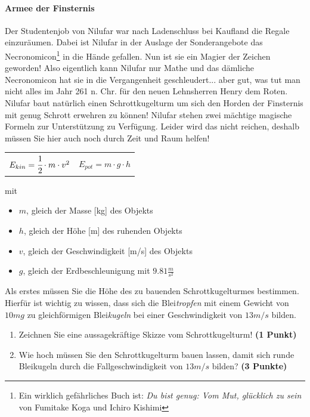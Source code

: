 \documentclass[a4paper, 9pt]{scrartcl}\usepackage[]{graphicx}\usepackage[]{xcolor}
\begin{document}
\ifcollection
\paragraph{Armee der Finsternis}
\fi



Der Studentenjob von Nilufar war nach Ladenschluss bei Kaufland die Regale einzuräumen. Dabei ist Nilufar in der Auslage der Sonderangebote das Necronomicon\footnote{Ein wirklich gefährliches Buch ist: \textit{Du bist genug: Vom Mut, glücklich zu sein} von Fumitake Koga und Ichiro Kishimi} in die Hände gefallen. Nun ist sie ein Magier der Zeichen geworden! Also eigentlich kann Nilufar nur Mathe und das dämliche Necronomicon hat sie in die Vergangenheit geschleudert... aber gut, was tut man nicht alles im Jahr 261 n. Chr. für den neuen Lehnsherren Henry dem Roten. Nilufar baut natürlich einen Schrottkugelturm um sich den
Horden der Finsternis mit genug Schrott erwehren zu können! Nilufar stehen zwei mächtige magische Formeln zur Unterstützung zu Verfügung. Leider wird das nicht reichen, deshalb müssen Sie hier auch noch durch Zeit und Raum helfen!

\begin{center}
  \begin{tabular}{cc}
    $E_{kin} = \cfrac{1}{2}\cdot m \cdot v^2$ & $E_{pot} = m \cdot g \cdot h$\\
  \end{tabular}
\end{center}

mit

\begin{itemize}[noitemsep]
\item $m$, gleich der Masse [kg] des Objekts
\item $h$, gleich der Höhe [m] des ruhenden Objekts
\item $v$, gleich der Geschwindigkeit [m/s] des Objekts
\item $g$, gleich der Erdbeschleunigung mit $9.81 \tfrac{m}{s^2}$ 
\end{itemize}

Als erstes müssen Sie die Höhe des zu bauenden Schrottkugelturmes bestimmen. Hierfür ist wichtig zu wissen, dass sich die Blei\textit{tropfen} mit einem Gewicht von $10mg$ zu gleichförmigen Blei\textit{kugeln} bei einer Geschwindigkeit von $13m/s$ bilden.

\begin{enumerate}
\item Zeichnen Sie eine aussagekräftige Skizze vom Schrottkugelturm! \textbf{(1 Punkt)}
\item Wie hoch müssen Sie den Schrottkugelturm bauen lassen, damit sich runde Bleikugeln durch die Fallgeschwindigkeit von $13m/s$ bilden? \textbf{(3 Punkte)}
\end{enumerate}
\end{document}
